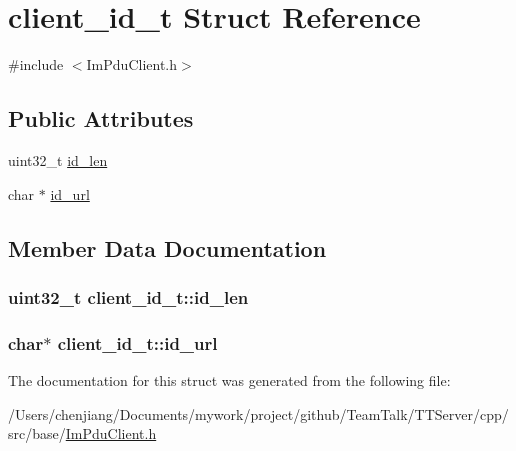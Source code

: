 \hypertarget{structclient__id__t}{}\section{client\+\_\+id\+\_\+t Struct Reference}
\label{structclient__id__t}


{\ttfamily \#include $<$Im\+Pdu\+Client.\+h$>$}

\subsection*{Public Attributes}
\begin{DoxyCompactItemize}
\item 
uint32\+\_\+t \hyperlink{structclient__id__t_a6e12c66cacde0ee0b44edc6ed3749054}{id\+\_\+len}
\item 
char $\ast$ \hyperlink{structclient__id__t_a0fc1188e6464122162f0066348ed98f2}{id\+\_\+url}
\end{DoxyCompactItemize}


\subsection{Member Data Documentation}
\hypertarget{structclient__id__t_a6e12c66cacde0ee0b44edc6ed3749054}{}
\subsubsection[{id\+\_\+len}]{\setlength{\rightskip}{0pt plus 5cm}uint32\+\_\+t client\+\_\+id\+\_\+t\+::id\+\_\+len}\label{structclient__id__t_a6e12c66cacde0ee0b44edc6ed3749054}
\hypertarget{structclient__id__t_a0fc1188e6464122162f0066348ed98f2}{}
\subsubsection[{id\+\_\+url}]{\setlength{\rightskip}{0pt plus 5cm}char$\ast$ client\+\_\+id\+\_\+t\+::id\+\_\+url}\label{structclient__id__t_a0fc1188e6464122162f0066348ed98f2}


The documentation for this struct was generated from the following file\+:\begin{DoxyCompactItemize}
\item 
/\+Users/chenjiang/\+Documents/mywork/project/github/\+Team\+Talk/\+T\+T\+Server/cpp/src/base/\hyperlink{_im_pdu_client_8h}{Im\+Pdu\+Client.\+h}\end{DoxyCompactItemize}

